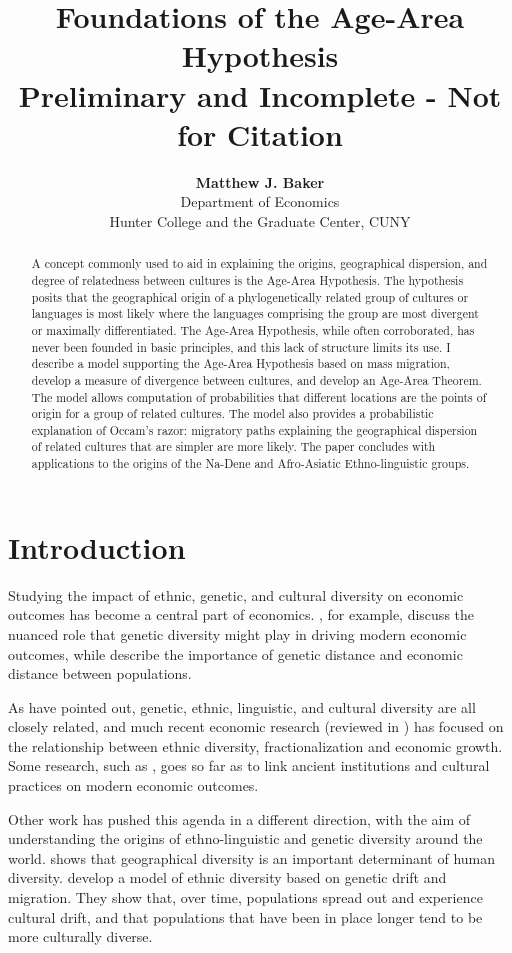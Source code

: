 \documentclass[11pt]{article}
\title{Foundations of the Age-Area Hypothesis \\ \large{Preliminary and Incomplete - Not for Citation}}
\author{\textbf{Matthew J. Baker} \\ Department of Economics \\ Hunter College and the Graduate Center, CUNY}
\begin{document}
\maketitle
\begin{abstract}
\noindent A concept commonly used to aid in explaining the origins, geographical dispersion, and degree of relatedness between cultures is the Age-Area Hypothesis. The hypothesis posits that the geographical origin of a phylogenetically related group of cultures or languages is most likely where the languages comprising the group are most divergent or maximally differentiated. The Age-Area Hypothesis, while often corroborated, has never been founded in basic principles, and this lack of structure limits its use. I describe a model supporting the Age-Area Hypothesis based on mass migration, develop a measure of divergence between cultures, and develop an Age-Area Theorem. The model allows computation of probabilities that different locations are the points of origin for a  group of related cultures. The model also provides a probabilistic explanation of Occam's razor: migratory paths explaining the geographical dispersion of related cultures that are simpler are  more likely. The paper concludes with applications to the origins of the Na-Dene and Afro-Asiatic Ethno-linguistic groups. 
\end{abstract}
\newpage

\section{Introduction}
Studying the impact of ethnic, genetic, and cultural diversity on economic outcomes has become a central part of economics. \cite{ashraf13}, for example, discuss the nuanced role that genetic diversity might play in driving modern economic outcomes, while \cite{spolaore09} describe the importance of genetic distance and economic distance between populations. 

As \cite{cavalli95} have pointed out, genetic, ethnic, linguistic, and cultural diversity are all closely related, and much recent economic research (reviewed in \cite{alesina05}) has focused on the relationship between ethnic diversity, fractionalization and economic growth. Some research, such as \cite{spolaore13}, goes so far as to link ancient institutions and cultural practices on modern economic outcomes. 

Other work has pushed this agenda in a different direction, with the aim of understanding the origins of ethno-linguistic and genetic diversity around the world.   \cite{michalopoulos12} shows that geographical diversity is an important determinant of human diversity.  \cite{ahlerup12} develop a model of ethnic diversity based on genetic drift and migration. They show that, over time, populations spread out and experience cultural drift, and that populations that have been in place longer tend to be more culturally diverse. 
\end{document}
